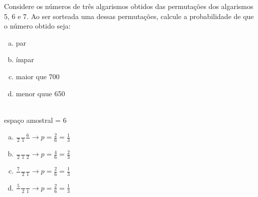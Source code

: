 \begin{ex}
Considere os números de três algarismos obtidos das permutações dos algarismos 5, 6 e 7. Ao ser sorteada uma dessas permutações, calcule a probabilidade de que o número obtido seja:
   \begin{enumerate}[(a)]
   \item par
   \item ímpar
   \item maior que 700
   \item menor quue 650
   \end{enumerate}
      \begin{sol}
        \phantom{A} \\
        espaço amostral = 6
         \begin{enumerate} [(a)]
             \item $\frac{\phantom{A}}{2}\frac{\phantom{A}}{1}\frac{6}{\phantom{A}}\rightarrow p=\frac{2}{6}=\frac{1}{3}$
             \item $\frac{\phantom{A}}{2}\frac{\phantom{A}}{1}\frac{\phantom{A}}{2} \rightarrow p=\frac{4}{6}=\frac{2}{3}$
             \item $\frac{7}{\phantom{A}}\frac{\phantom{A}}{2}\frac{\phantom{A}}{1} \rightarrow p=\frac{2}{6}=\frac{1}{3}$  \item $\frac{5}{\phantom{A}}\frac{\phantom{A}}{2}\frac{\phantom{A}}{1} \rightarrow p=\frac{2}{6}=\frac{1}{3}$
         \end{enumerate}
      \end{sol}
\end{ex}